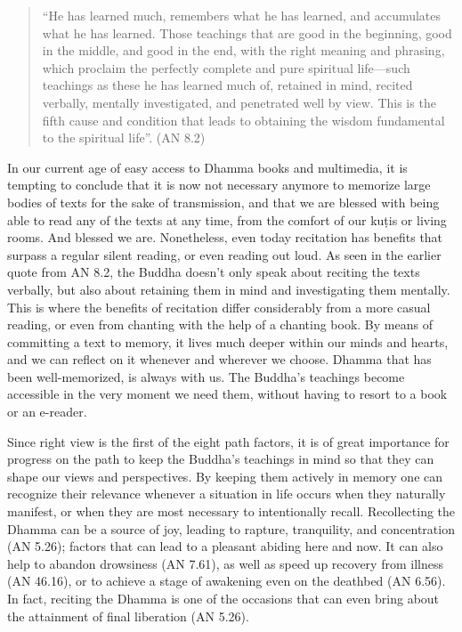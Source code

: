 \begin{quote}
  ``He has learned much, remembers what he has learned, and accumulates what he has learned. Those teachings that are good in the beginning, good in the middle, and good in the end, with the right meaning and phrasing, which proclaim the perfectly complete and pure spiritual life—such teachings as these he has learned much of, retained in mind, recited verbally, mentally investigated, and penetrated well by view. This is the fifth cause and condition that leads to obtaining the wisdom fundamental to the spiritual life''. (AN 8.2)
\end{quote}

In our current age of easy access to Dhamma books and multimedia, it is tempting to conclude that it is now not necessary anymore to memorize large bodies of texts for the sake of transmission, and that we are blessed with being able to read any of the texts at any time, from the comfort of our kuṭis or living rooms. And blessed we are. Nonetheless, even today recitation has benefits that surpass a regular silent reading, or even reading out loud. As seen in the earlier quote from AN 8.2, the Buddha doesn't only speak about reciting the texts verbally, but also about retaining them in mind and investigating them mentally. This is where the benefits of recitation differ considerably from a more casual reading, or even from chanting with the help of a chanting book. By means of committing a text to memory, it lives much deeper within our minds and hearts, and we can reflect on it whenever and wherever we choose. Dhamma that has been well-memorized, is always with us. The Buddha's teachings become accessible in the very moment we need them, without having to resort to a book or an e-reader.

Since right view is the first of the eight path factors, it is of great importance for progress on the path to keep the Buddha's teachings in mind so that they can shape our views and perspectives. By keeping them actively in memory one can recognize their relevance whenever a situation in life occurs when they naturally manifest, or when they are most necessary to intentionally recall. Recollecting the Dhamma can be a source of joy, leading to rapture, tranquility, and concentration (AN 5.26); factors that can lead to a pleasant abiding here and now. It can also help to abandon drowsiness (AN 7.61), as well as speed up recovery from illness (AN 46.16), or to achieve a stage of awakening even on the deathbed (AN 6.56). In fact, reciting the Dhamma is one of the occasions that can even bring about the attainment of final liberation (AN 5.26).

